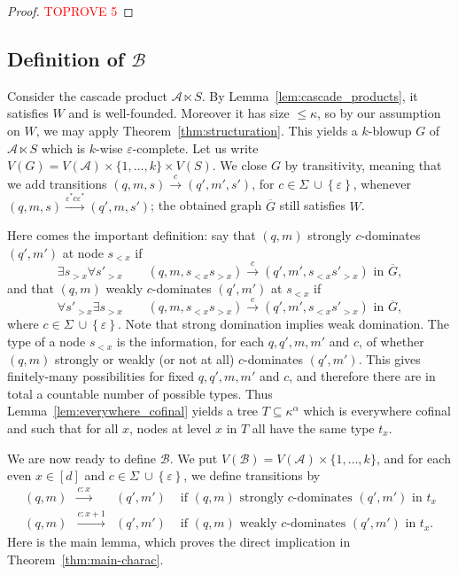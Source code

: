 \documentclass[a4paper,UKenglish,cleveref, thm-restate]{lipics-v2021}
\newcommand{\re}[1]{\xrightarrow{#1}}
\newcommand{\tin}{\text{ in }}
\newcommand{\tif}{\text{ if }}
\newcommand{\eps}{\varepsilon}
\newcommand{\A}{\mathcal{A}}
\newcommand{\casc}{\ltimes}
\newcommand{\Sigmaeps}{\Sigma\ {\cup} \left\{\eps\right\}}
\newcommand{\B}{\mathcal B}
\renewcommand{\d}{[d]}
\begin{document}
\begin{proof}\textcolor{red}{TOPROVE 5}\end{proof}

\subsection{Definition of $\B$}

Consider the cascade product $\A \casc S$. 
By Lemma~\ref{lem:cascade_products}, it satisfies $W$ and is well-founded.
Moreover it has size $\leq \kappa$, so by our assumption on $W$, we may apply Theorem~\ref{thm:structuration}.
This yields a $k$-blowup $G$ of ${\A \casc S}$ which is $k$-wise $\eps$-complete.
Let us write $V(G) = V(\A) \times \{1,\dots,k\} \times V(S)$.
We close $G$ by transitivity, meaning that we add transitions $(q,m,s) \re c (q',m',s')$, for $c \in \Sigmaeps$, whenever $(q,m,s) \re{\eps^* c \eps^*} (q',m,s')$; the obtained graph $\overline{G}$ still satisfies $W$.

Here comes the important definition: say that $(q,m)$ strongly $c$-dominates $(q',m')$ at node $s_{< x}$ if
\[
    \exists s_{> x} \forall s'_{> x} \qquad (q,m,s_{< x} s_{> x}) \re c (q',m',s_{< x} s'_{> x}) \tin \overline{G},
\]
and that $(q,m)$ weakly $c$-dominates $(q',m')$ at $s_{< x}$ if
\[
    \forall s'_{> x} \exists s_{> x} \qquad (q,m,s_{< x} s_{> x}) \re c (q',m',s_{< x} s'_{> x}) \tin \overline{G},
\]
where $c \in \Sigmaeps$.
Note that strong domination implies weak domination.
The type of a node $s_{< x}$ is the information, for each $q,q',m,m'$ and $c$, of whether $(q,m)$ strongly or weakly (or not at all) $c$-dominates $(q',m')$.
This gives finitely-many possibilities for fixed $q,q',m,m'$ and $c$, and therefore there are in total a countable number of possible types.
Thus Lemma~\ref{lem:everywhere_cofinal} yields a tree $T \subseteq \kappa^{\alpha}$ which is everywhere cofinal and such that for all $x$, nodes at level $x$ in $T$ all have the same type $t_x$.

We are now ready to define $\B$.
We put $V(\B) = V(\A) \times \{1,\dots,k\}$, and for each even $x \in \d$ and $c \in \Sigmaeps$, we define transitions by
\[
    \begin{array}{lcrl}
    (q,m) &\re{c:x}& (q',m') & \tif (q,m) \text{ strongly $c$-dominates } (q',m') \tin t_x \\
    (q,m) &\re{c:x+1}& (q',m') & \tif (q,m) \text{ weakly $c$-dominates } (q',m')\tin t_x.
    \end{array}
\]
Here is the main lemma, which proves the direct implication in Theorem~\ref{thm:main-charac}.
\end{document}

